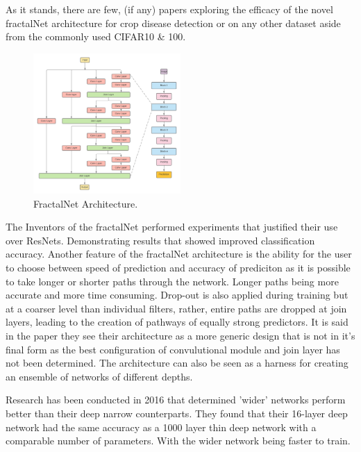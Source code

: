  \par
  As it stands, there are few, (if any) papers exploring the efficacy of the novel fractalNet architecture \cite{Larsson2016} for crop disease detection or on any other dataset aside from the commonly used CIFAR10 \& 100.
  \par
    \begin{figure}
      \centering
      \includegraphics[width=0.5\textwidth]{Images/FractalNetArchitectureCopy}
      \caption{\label{fig:FractalNet_arcitecture}FractalNet Architecture.}
    \end{figure}
  \par
  The Inventors of the fractalNet performed experiments that justified their use over ResNets. Demonstrating results that showed improved classification accuracy. Another feature of the fractalNet architecture is the ability for the user to choose between speed of prediction and accuracy of prediciton as it is possible to take longer or shorter paths through the network. Longer paths being more accurate and more time consuming. Drop-out is also applied during training but at a coarser level than individual filters, rather, entire paths are dropped at join layers, leading to the creation of pathways of equally strong predictors.
  It is said in the paper they see their architecture as a more generic design that is not in it's final form as the best configuration of convulutional module and join layer has not been determined. The architecture can also be seen as a harness for creating an ensemble of networks of different depths.
  \par
  Research has been conducted in 2016 \cite{Zagoruyko} that determined 'wider' networks perform better than their deep narrow counterparts. They found that their 16-layer deep network had the same accuracy as a 1000 layer thin deep network with a comparable number of parameters. With the wider network being faster to train.
